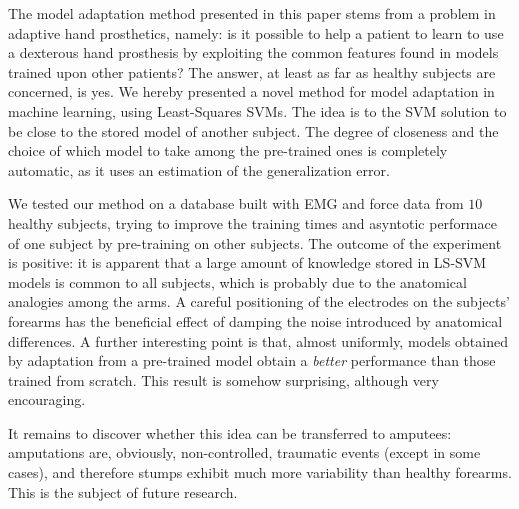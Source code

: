 The model adaptation method presented in this paper stems from a
problem in adaptive hand prosthetics, namely: is it possible to help a
patient to learn to use a dexterous hand prosthesis 
by exploiting the common features found in models trained
upon other patients? The answer, at least as far as healthy subjects
are concerned, is yes. We  hereby presented a novel method for
model adaptation in machine learning, using Least-Squares SVMs. The
idea is to 
the SVM solution to be close to the stored model
of another subject. The degree of closeness and the choice of which model
to take among the pre-trained ones is completely automatic, as it uses an estimation
of the generalization error.

We tested our method on a database built with EMG and force data from
$10$ healthy subjects, trying to improve the training times and asyntotic performace of one
subject by pre-training on other subjects. The outcome of the
experiment is positive: it is apparent that a large amount of
knowledge stored in LS-SVM models is common to all subjects, which is
probably due to the anatomical analogies among the arms. A careful
positioning of the electrodes on the subjects' forearms has the
beneficial effect of damping the noise introduced by anatomical
differences.
A further interesting point is that, almost uniformly, models obtained
by adaptation from a pre-trained model obtain a \emph{better}
performance than those trained from scratch. This result is somehow
surprising, although very encouraging.

It remains to discover whether this idea can be transferred to
amputees: amputations are, obviously, non-controlled, traumatic events
(except in some cases), and therefore stumps exhibit much more
variability than healthy forearms. This is the subject of future
research.
